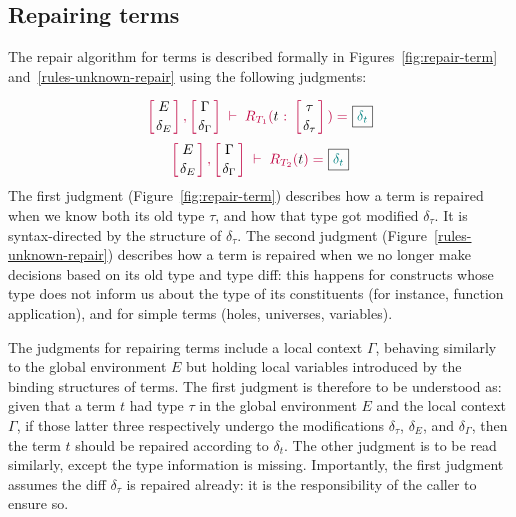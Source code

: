 \subsection{Repairing terms} \label{chick-design-repair-term}

The repair algorithm for terms is described formally in
Figures~\ref{fig:repair-term} and~\ref{rules-unknown-repair} using the following
judgments:

{
  \[
    {\turnstile
      { \dcontext{E}{\delta_E}{\Gamma}{\delta_\Gamma} }
      {\repair{t}{\delta_t}{\tau}{\delta_\tau}}
    }
  \]
  \[
    {\turnstile
      { \dcontext{E}{\delta_E}{\Gamma}{\delta_\Gamma} }
      {\repairTermWithoutType{t}{\delta_t}}
    }
  \]
}%
%
The first judgment (Figure~\ref{fig:repair-term}) describes how a term is
repaired when we know both its old type $\tau$, and how that type got modified
$\delta_\tau$.  It is syntax-directed by the structure of $\delta_\tau$.  The
second judgment (Figure~\ref{rules-unknown-repair}) describes how a term is
repaired when we no longer make decisions based on its old type and type diff:
this happens for constructs whose type does not inform us about the type of its
constituents (for instance, function application), and for simple terms (holes,
universes, variables).

The judgments for repairing terms include a local context $\Gamma$, behaving
similarly to the global environment $E$ but holding local variables introduced
by the binding structures of terms.  The first judgment is therefore to be
understood as: given that a term $t$ had type $\tau$ in the global environment
$E$ and the local context $\Gamma$, if those latter three respectively undergo
the modifications $\delta_\tau$, $\delta_E$, and $\delta_\Gamma$, then the term
$t$ should be repaired according to $\delta_t$.  The other judgment is to be
read similarly, except the type information is missing.  Importantly, the first
judgment assumes the diff $\delta_\tau$ is repaired already: it is the
responsibility of the caller to ensure so.




